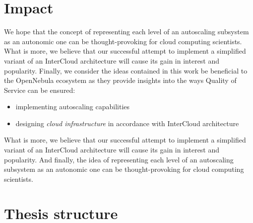 \section{Impact}
We hope that the concept of representing each level of an autoscaling subsystem as an autonomic one can be thought-provoking for cloud computing scientists.  What is more, we believe that our successful attempt to implement a simplified variant of an InterCloud architecture will cause its gain in interest and popularity. 
Finally, we consider the ideas contained in this work be beneficial to the OpenNebula ecosystem as they provide insights into the ways Quality of Service can be ensured:
\begin{itemize}
  \item implementing autoscaling capabilities
  \item designing \emph{cloud infrastructure} in accordance with InterCloud architecture
\end{itemize}
What is more, we believe that our successful attempt to implement a simplified variant of an InterCloud architecture will cause its gain in interest and popularity. And finally, the idea of representing each level of an autoscaling subsystem as an autonomic one can be thought-provoking for cloud computing scientists.

\section{Thesis structure}
